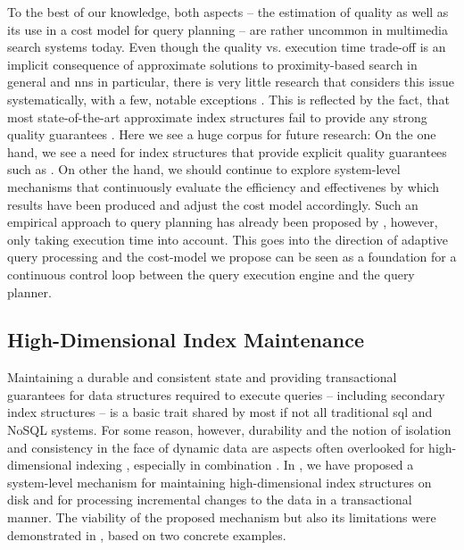 To the best of our knowledge, both aspects -- the estimation of quality as well as its use in a cost model for query planning -- are rather uncommon in multimedia search systems today. Even though the quality vs. execution time trade-off is an implicit consequence of approximate solutions to proximity-based search in general and \acrshort{nns} in particular, there is very little research that considers this issue systematically, with a few, notable exceptions \cite{Weber:2000Trading,Blok2001:Predicting,Siguroardottir:2005Quality}. This is reflected by the fact, that most state-of-the-art approximate index structures fail to provide any strong quality guarantees \cite{Echihabi:2021High}. Here we see a huge corpus for future research: On the one hand, we see a need for index structures that provide explicit quality guarantees such as \cite{Lu:2020VHP}. On other the hand, we should continue to explore system-level mechanisms that continuously evaluate the efficiency and effectivenes by which results have been produced and adjust the cost model accordingly. Such an empirical approach to query planning has already been proposed by \cite{Giangreco:2018Database}, however, only taking execution time into account. This goes into the direction of adaptive query processing \cite{Deshpande:2007Adaptive} and the cost-model we propose can be seen as a foundation for a continuous control loop between the query execution engine and the query planner.

\subsection{High-Dimensional Index Maintenance}

Maintaining a durable and consistent state and providing transactional guarantees for data structures required to execute queries -- including secondary index structures -- is a basic trait shared by most if not all traditional \acrshort{sql} and NoSQL systems. For some reason, however, durability and the notion of isolation and consistency in the face of dynamic data are aspects often overlooked for high-dimensional indexing \cite{Amsaleg:2014Database,Hojsgaard:2019Index}, especially in combination \cite{Amsaleg:2014Database}. In , we have proposed a system-level mechanism for maintaining high-dimensional index structures on disk and for processing incremental changes to the data in a transactional manner. The viability of the proposed mechanism but also its limitations were demonstrated in , based on two concrete examples.


